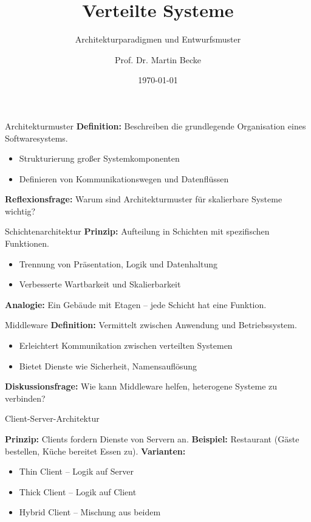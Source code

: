 \documentclass{beamer}
\title{Verteilte Systeme}
\subtitle{Architekturparadigmen und Entwurfsmuster}
\author{Prof. Dr. Martin Becke}
\date{\today}
\begin{document}
\begin{frame}
    \titlepage
\end{frame}

\begin{frame}{Architekturmuster}
    \textbf{Definition:} Beschreiben die grundlegende Organisation eines Softwaresystems.
    \begin{itemize}
        \item Strukturierung großer Systemkomponenten
        \item Definieren von Kommunikationswegen und Datenflüssen
    \end{itemize}
    \textbf{Reflexionsfrage:} Warum sind Architekturmuster für skalierbare Systeme wichtig?
\end{frame}

\begin{frame}{Schichtenarchitektur}
    \textbf{Prinzip:} Aufteilung in Schichten mit spezifischen Funktionen.

    \begin{itemize}
        \item Trennung von Präsentation, Logik und Datenhaltung
        \item Verbesserte Wartbarkeit und Skalierbarkeit
    \end{itemize}
    \textbf{Analogie:} Ein Gebäude mit Etagen – jede Schicht hat eine Funktion.
\end{frame}

\begin{frame}{Middleware}
    \textbf{Definition:} Vermittelt zwischen Anwendung und Betriebssystem.
    \begin{itemize}
        \item Erleichtert Kommunikation zwischen verteilten Systemen
        \item Bietet Dienste wie Sicherheit, Namensauflösung
    \end{itemize}
    \textbf{Diskussionsfrage:} Wie kann Middleware helfen, heterogene Systeme zu verbinden?
\end{frame}

\begin{frame}{Client-Server-Architektur}
   
    \textbf{Prinzip:} Clients fordern Dienste von Servern an.
    \textbf{Beispiel:} Restaurant (Gäste bestellen, Küche bereitet Essen zu).
    \textbf{Varianten:}
    \begin{itemize}
        \item Thin Client – Logik auf Server
        \item Thick Client – Logik auf Client
        \item Hybrid Client – Mischung aus beidem
    \end{itemize}
\end{frame}
\end{document}
